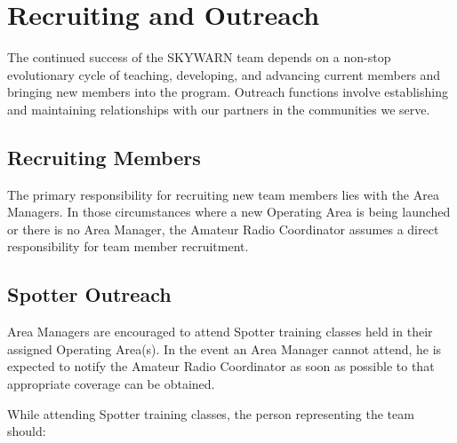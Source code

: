 \documentclass[pdflatex,letterpaper,twoside,12pt]{book}
\begin{document}

\chapter{Recruiting and Outreach}

The continued success of the SKYWARN team depends on a non-stop evolutionary cycle of teaching, developing, and advancing current members and bringing new members into the program.  Outreach functions involve establishing and maintaining relationships with our partners in the communities we serve.


\section{Recruiting Members}

The primary responsibility for recruiting new team members lies with the Area Managers.  In those circumstances where a new Operating Area is being launched or there is no Area Manager, the Amateur Radio Coordinator assumes a direct responsibility for team member recruitment.


\section{Spotter Outreach}

Area Managers are encouraged to attend Spotter training classes held in their assigned Operating Area(s).  In the event an Area Manager cannot attend, he is expected to notify the Amateur Radio Coordinator as soon as possible to that appropriate coverage can be obtained.

While attending Spotter training classes, the person representing the team should:
\end{document}
